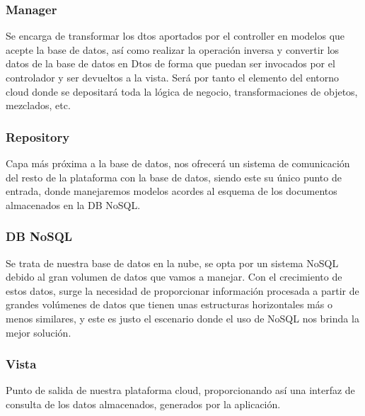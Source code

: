 \documentclass[12pt,a4paper,oneside]{book} %
\begin{document}
\subsubsection{Manager}
Se encarga de transformar los dtos aportados por el controller en modelos que acepte la base de datos, así como realizar la operación inversa y convertir los datos de la base de datos en Dtos de forma que puedan ser invocados por el controlador y ser devueltos a la vista. 
\newline
\newline
Será por tanto el elemento del entorno cloud donde se depositará toda la lógica de negocio, transformaciones de objetos, mezclados, etc. 
\subsubsection{Repository}
Capa más próxima a la base de datos, nos ofrecerá un sistema de comunicación del resto de la plataforma con la base de datos, siendo este su único punto de entrada, donde manejaremos modelos acordes al esquema de los documentos almacenados en la DB NoSQL. 
\subsubsection{DB NoSQL}
Se trata de nuestra base de datos en la nube, se opta por un sistema NoSQL debido al gran volumen de datos que vamos a manejar. Con el crecimiento de estos datos, surge la necesidad de proporcionar información procesada a partir de grandes volúmenes de datos que tienen unas estructuras horizontales más o menos similares, y este es justo el escenario donde el uso de NoSQL nos brinda la mejor solución. 
\subsubsection{Vista}
Punto de salida de nuestra plataforma cloud, proporcionando así una interfaz de consulta de los datos almacenados, generados por la aplicación. \\
\newpage 
\end{document}
